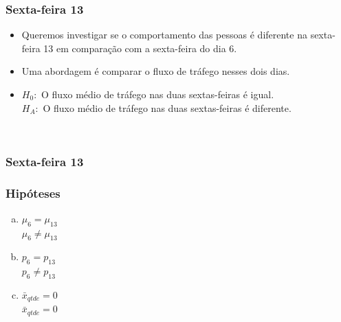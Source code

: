 
\begin{frame}
\frametitle{Sexta-feira 13}

\begin{itemize}
\justifying
\item Queremos investigar se o comportamento das pessoas é diferente na sexta-feira 13 em comparação com a sexta-feira do dia 6.

\pause
\justifying
\item Uma abordagem é comparar o fluxo de tráfego nesses dois dias.

\pause
\justifying
\small
\item $H_0:$ O fluxo médio de tráfego nas duas sextas-feiras é igual. \\
$H_A:$ O fluxo médio de tráfego nas duas sextas-feiras é diferente.
\end{itemize}

$\:$ \\
\end{frame}

\begin{frame}
\frametitle{Sexta-feira 13}
\justifying
{}
\justifying
{}

\end{frame}


\begin{frame}
\frametitle{Hipóteses}
\justifying
{}

\begin{enumerate}[(a)]
\item  {} $\mu_{6} = \mu_{13}$ \\
 $\mu_{6} \ne \mu_{13}$
\item  {} $p_{6} = p_{13}$ \\
 $p_{6} \ne p_{13}$
\item  {} $\bar{x}_{qtde} = 0$ \\
 $\bar{x}_{qtde} = 0$
\end{enumerate}

\end{frame}

